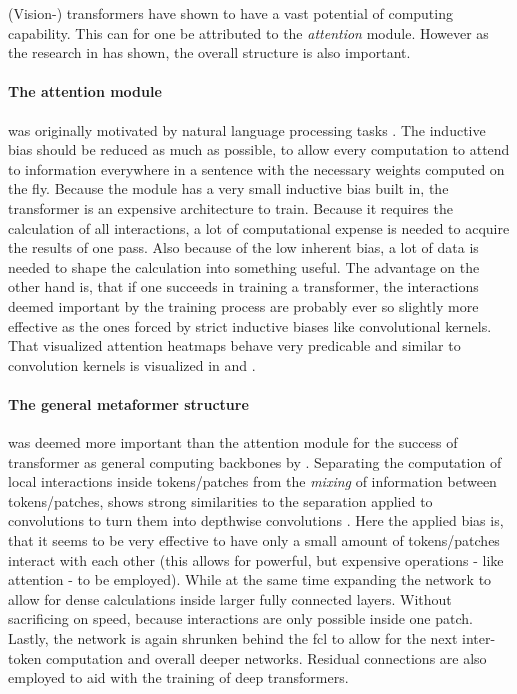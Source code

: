 (Vision-) transformers have shown to have a vast potential of computing capability. 
This can for one be attributed to the \emph{attention} module. 
However as the research in \cite{metaformerPaper} has shown, the overall structure is also important.

\paragraph{The attention module} was originally motivated by natural language processing tasks \cite{attentionIsAllYouNeed}. The inductive bias should be reduced as much as possible, to allow every computation to attend to information everywhere in a sentence with the necessary weights computed on the fly.
Because the module has a very small inductive bias built in, the transformer is an expensive architecture to train. 
Because it requires the calculation of all interactions, a lot of computational expense is needed to acquire the results of one pass.
Also because of the low inherent bias, a lot of data is needed to shape the calculation into something useful.
The advantage on the other hand is, that if one succeeds in training a transformer, the interactions deemed important by the training process are probably ever so slightly more effective as the ones forced by strict inductive biases like convolutional kernels. That visualized attention heatmaps behave very predicable and similar to convolution kernels is visualized in \cite{dinoPaper} and \cite{imageWorth16x16}.

\paragraph{The general metaformer structure} was deemed more important than the attention module for the success of transformer as general computing backbones by \cite{metaformerPaper}.
Separating the computation of local interactions inside tokens/patches from the \emph{mixing} of information between tokens/patches, shows strong similarities to the separation applied to convolutions to turn them into depthwise convolutions \cite{mobileNetPaper}.
Here the applied bias is, that it seems to be very effective to have only a small amount of tokens/patches interact with each other (this allows for powerful, but expensive operations - like attention - to be employed).
While at the same time expanding the network to allow for dense calculations inside larger fully connected layers. Without sacrificing on speed, because interactions are only possible inside one patch.
Lastly, the network is again shrunken behind the fcl to allow for the next inter-token computation and overall deeper networks.
Residual connections are also employed to aid with the training of deep transformers.

